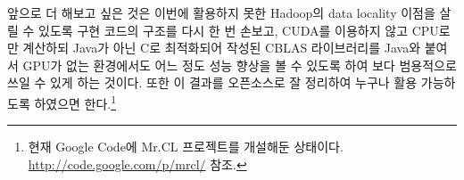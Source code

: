 \documentclass[a4paper]{article}
\begin{document}
\begin{multicols}{2}
앞으로 더 해보고 싶은 것은 이번에 활용하지 못한 Hadoop의 data locality 이점을 살릴 수 있도록 구현 코드의 구조를 다시 한 번 손보고, CUDA를 이용하지 않고 CPU로만 계산하되 Java가 아닌 C로 최적화되어 작성된 CBLAS 라이브러리를 Java와 붙여서 GPU가 없는 환경에서도 어느 정도 성능 향상을 볼 수 있도록 하여 보다 범용적으로 쓰일 수 있게 하는 것이다.
또한 이 결과를 오픈소스로 잘 정리하여 누구나 활용 가능하도록 하였으면 한다.\footnote{현재 Google Code에 Mr.CL 프로젝트를 개설해둔 상태이다. \url{http://code.google.com/p/mrcl/} 참조.}

\end{multicols}
\end{document}
